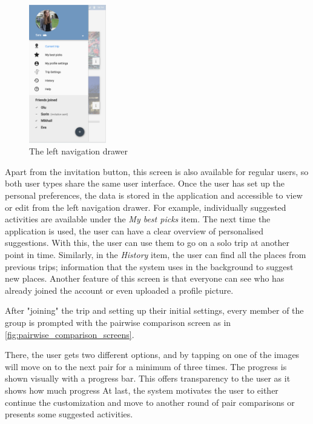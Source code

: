 \documentclass[11pt,a4paper,oneside]{article}
\begin{document}
\begin{figure}[H]
    \centering
    \includegraphics[width=0.3\textwidth]{paper/imgs/hifi_prototypes/left_screen.png}
    \caption{The left navigation drawer}
    \label{fig:left_menu}
\end{figure}


Apart from the invitation button, this screen is also available for regular users, so both user types share the same user interface. Once the user has set up the personal preferences, the data is stored in the application and accessible to view or edit from the left navigation drawer. For example, individually suggested activities are available under the \emph{My best picks} item. The next time the application is used, the user can have a clear overview of personalised suggestions. With this, the user can use them to go on a solo trip at another point in time. Similarly, in the \emph{History} item, the user can find all the places from previous trips; information that the system uses in the background to suggest new places. Another feature of this screen is that everyone can see who has already joined the account or even uploaded a profile picture.

After "joining" the trip and setting up their initial settings, every member of the group is prompted with the pairwise comparison screen as in \autoref{fig:pairwise_comparison_screens}.

There, the user gets two different options, and by tapping on one of the images will move on to the next pair for a minimum of three times. The progress is shown visually with a progress bar. This offers transparency to the user as it shows how much progress  At last, the system motivates the user to either continue the customization and move to another round of pair comparisons or presents some suggested activities.
\end{document}
